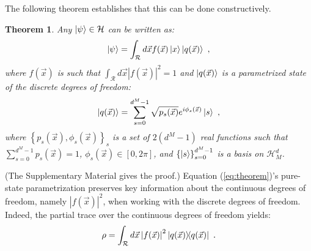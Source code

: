 \documentclass[draft,nofootinbib,pre,twocolumn,showpacs,showkeys,preprintnumbers,floatfix]{revtex4-1}
\newtheorem{theorem}{Theorem}
\newcommand{\1}{\mathbbm{1}}
\begin{document}
The following theorem establishes that this can be done constructively.

\begin{theorem}
\label{MainTheo}
Any $\ket{\psi} \in \mathcal{H}$ can be written as:
\begin{align}
\ket{\psi} = \int_{\mathcal{R}}d\vec{x} f(\vec{x}) \ket{x}\ket{q(\vec{x})} \label{eq:theorem}
  ~,
\end{align}
where $f(\vec{x})$ is such that $\int_{\mathcal{R}}d\vec{x} |f(\vec{x})|^2 = 1$
and $\ket{q(\vec{x})}$ is a parametrized state of the discrete degrees of
freedom:
\begin{align*}
\ket{q(\vec{x})}
  = \sum_{s=0}^{d^M-1} \sqrt{p_s(\vec{x})} e^{i\phi_s(\vec{x})} \ket{s}
  ~,
\end{align*}
where $\left\{ p_s(\vec{x}),\phi_s(\vec{x})\right\}_s$ is a set of $2(d^M-1)$
real functions such that $\sum_{s=0}^{d^M-1} p_s(\vec{x}) = 1$,
$\phi_s(\vec{x}) \in [0,2\pi]$, and $\left\{\ket{s}\right\}_{s=0}^{d^M-1}$ is a
basis on $\mathcal{H}_M^d$.
\end{theorem}

(The Supplementary Material gives the proof.)
Equation (\ref{eq:theorem})'s pure-state parametrization preserves key information
about the continuous degrees of freedom, namely $|f(\vec{x})|^2$, when working
with the discrete degrees of freedom. Indeed, the partial trace over the
continuous degrees of freedom yields:
\begin{align*}
\rho = \int_{\mathcal{R}} d\vec{x}
  \left\vert f(\vec{x})\right\vert^2 \ket{q(\vec{x})}\!\!\bra{q(\vec{x})}
  ~.
\end{align*}
\end{document}
